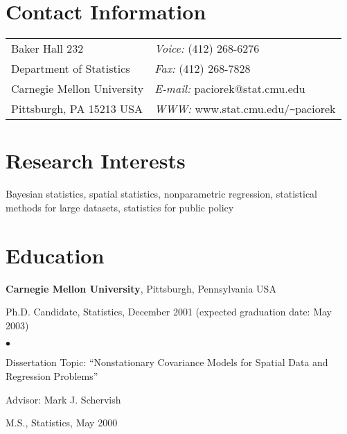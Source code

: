 \documentclass[overlapped,line]{res}
\newenvironment{list1}{
  \begin{list}{\ding{113}}{%
      \setlength{\itemsep}{0in}
      \setlength{\parsep}{0in} \setlength{\parskip}{0in}
      \setlength{\topsep}{0in} \setlength{\partopsep}{0in} 
      \setlength{\leftmargin}{0.17in}}}{\end{list}}
\newenvironment{list2}{
  \begin{list}{$\bullet$}{%
      \setlength{\itemsep}{0in}
      \setlength{\parsep}{0in} \setlength{\parskip}{0in}
      \setlength{\topsep}{0in} \setlength{\partopsep}{0in} 
      \setlength{\leftmargin}{0.2in}}}{\end{list}}
\begin{document}

\begin{resume}
\section{\sc Contact Information}
\vspace{.05in}
\begin{tabular}{@{}p{2in}p{4in}}
Baker Hall 232             & {\it Voice:}  (412) 268-6276 \\            
Department of Statistics   & {\it Fax:}    (412) 268-7828 \\         
Carnegie Mellon University & {\it E-mail:}  paciorek@stat.cmu.edu\\       
Pittsburgh, PA  15213 USA  & {\it WWW:} www.stat.cmu.edu/\verb+~+paciorek \\     
\end{tabular}


\section{\sc Research Interests}
Bayesian statistics, spatial statistics, nonparametric regression,
statistical methods for large datasets, statistics for public policy

\section{\sc Education}
{\bf Carnegie Mellon University}, Pittsburgh, Pennsylvania USA\\
\vspace*{-.1in}
\begin{list1}
\item[] Ph.D. Candidate, Statistics, December 2001 (expected
  graduation date: May 2003)
\begin{list2}
\vspace*{.05in}
\item Dissertation Topic:  ``Nonstationary Covariance Models for
  Spatial Data and Regression Problems'' 
\item Advisor:  Mark J. Schervish
\end{list2}
\vspace*{.05in}
\item[] M.S., Statistics,  May 2000
\end{list1}


\end{resume}
\end{document}
